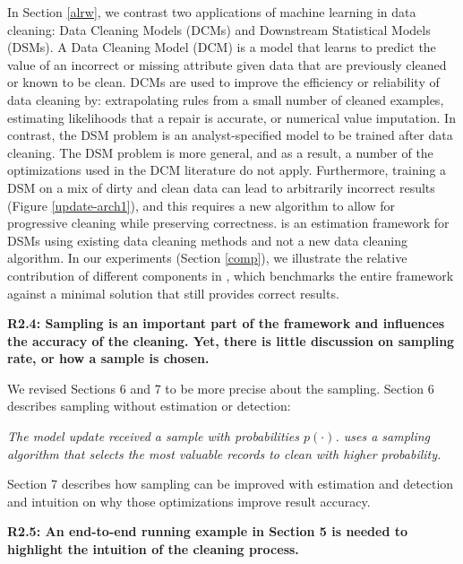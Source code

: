 In Section \ref{alrw}, we contrast two applications of machine learning in data cleaning: Data Cleaning Models (DCMs) and Downstream Statistical Models (DSMs).
A Data Cleaning Model (DCM) is a model that learns to predict the value of an incorrect or missing attribute given data that are previously cleaned or known to be clean.
DCMs are used to improve the efficiency or reliability of data cleaning by: extrapolating rules from a small number of cleaned examples, estimating likelihoods that a repair is accurate, or numerical value imputation.
In contrast, the DSM problem is an analyst-specified model to be trained after data cleaning.
The DSM problem is more general, and as a result, a number of the optimizations used in the DCM literature do not apply.
Furthermore, training a DSM on a mix of dirty and clean data can lead to arbitrarily incorrect results (Figure \ref{update-arch1}), and this requires a new algorithm to allow for progressive cleaning while preserving correctness.
\sys is an estimation framework for DSMs using existing data cleaning methods and not a new data cleaning algorithm.
In our experiments (Section \ref{comp}), we illustrate the relative contribution of different components in \sys, which benchmarks the entire framework against a minimal solution that still provides correct results.


\vspace{0.5em}

\textbf{R2.4: Sampling is an important part of the framework and influences the accuracy of the cleaning. Yet, there is little discussion on sampling rate, or how a sample is chosen.}

We revised Sections 6 and 7 to be more precise about the sampling.
Section 6 describes sampling without estimation or detection:

\emph{The model update received a sample with probabilities $p(\cdot)$.
\sys uses a sampling algorithm that selects the most valuable records to clean with higher probability. }

\vspace{0.5em}

Section 7 describes how sampling can be improved with estimation and detection and intuition on why those optimizations improve result accuracy.

\vspace{0.5em}

\textbf{R2.5: An end-to-end running example in Section 5 is needed to highlight the intuition of the cleaning process.}

